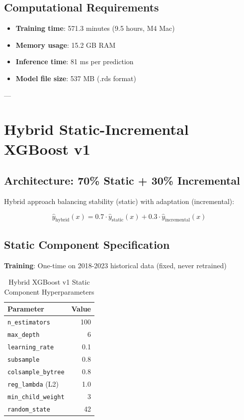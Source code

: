 \subsection{Computational Requirements}

\begin{itemize}
\item \textbf{Training time}: 571.3 minutes (9.5 hours, M4 Mac)
\item \textbf{Memory usage}: 15.2 GB RAM
\item \textbf{Inference time}: 81 ms per prediction
\item \textbf{Model file size}: 537 MB (.rds format)
\end{itemize}

---

\section{Hybrid Static-Incremental XGBoost v1}

\subsection{Architecture: 70\% Static + 30\% Incremental}

Hybrid approach balancing stability (static) with adaptation (incremental):

\begin{equation}
\hat{y}_{\text{hybrid}}(x) = 0.7 \cdot \hat{y}_{\text{static}}(x) + 0.3 \cdot \hat{y}_{\text{incremental}}(x)
\label{eq:hybrid-architecture}
\end{equation}

\subsection{Static Component Specification}

\textbf{Training}: One-time on 2018-2023 historical data (fixed, never retrained)

\begin{table}[h]
\centering
\caption{Hybrid XGBoost v1 Static Component Hyperparameters}
\label{tab:hybrid-static-hyperparameters}
\begin{tabular}{lr}
\toprule
\textbf{Parameter} & \textbf{Value} \\
\midrule
\texttt{n\_estimators} & 100 \\
\texttt{max\_depth} & 6 \\
\texttt{learning\_rate} & 0.1 \\
\texttt{subsample} & 0.8 \\
\texttt{colsample\_bytree} & 0.8 \\
\texttt{reg\_lambda} (L2) & 1.0 \\
\texttt{min\_child\_weight} & 3 \\
\texttt{random\_state} & 42 \\
\bottomrule
\end{tabular}
\end{table}

